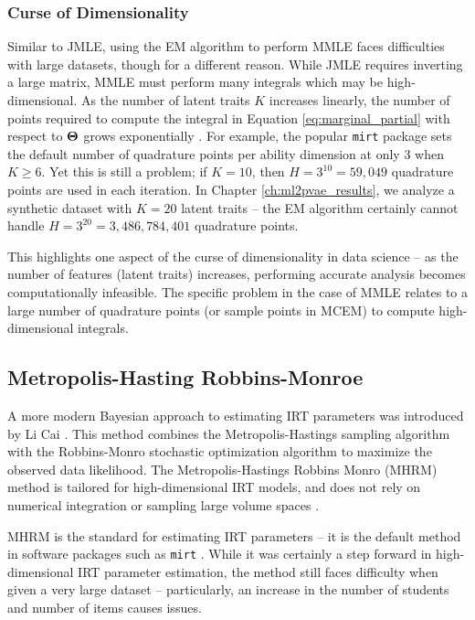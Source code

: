 \subsubsection{Curse of Dimensionality} \label{sec:dim}
Similar to JMLE, using the EM algorithm to perform MMLE faces difficulties with large datasets, though for a different reason. While JMLE requires inverting a large matrix, MMLE must perform many integrals which may be high-dimensional. As the number of latent traits $K$ increases linearly, the number of points required to compute the integral in Equation \ref{eq:marginal_partial} with respect to $\boldsymbol{\Theta}$ grows exponentially \cite{cai2010}. For example, the popular \verb!mirt! package \cite{mirt} sets the default number of quadrature points per ability dimension at only $3$ when $K\geq6$. Yet this is still a problem; if $K=10$, then $H = 3^{10} = 59,049$ quadrature points are used in each iteration. In Chapter \ref{ch:ml2pvae_results}, we analyze a synthetic dataset with $K=20$ latent traits -- the EM algorithm certainly cannot handle $H=3^{20} = 3,486,784,401$ quadrature points.

This highlights one aspect of the curse of dimensionality in data science -- as the number of features (latent traits) increases, performing accurate analysis becomes computationally infeasible. The specific problem in the case of MMLE relates to a large number of quadrature points (or sample points in MCEM) to compute high-dimensional integrals.


\subsection{Metropolis-Hasting Robbins-Monroe}
A more modern Bayesian approach to estimating IRT parameters was introduced by Li Cai \cite{cai2009} \cite{cai2010}. This method combines the Metropolis-Hastings sampling algorithm \cite{hastings1970} with the Robbins-Monro stochastic optimization algorithm \cite{robbins1951} to maximize the observed data likelihood. The Metropolis-Hastings Robbins Monro (MHRM) method is tailored for high-dimensional IRT models, and does not rely on numerical integration or sampling large volume spaces \cite{han2014}. 

MHRM is the standard for estimating IRT parameters -- it is the default method in software packages such as \verb!mirt! \cite{mirt}. While it was certainly a step forward in high-dimensional IRT parameter estimation, the method still faces difficulty when given a very large dataset -- particularly, an increase in the number of students and number of items causes issues.

